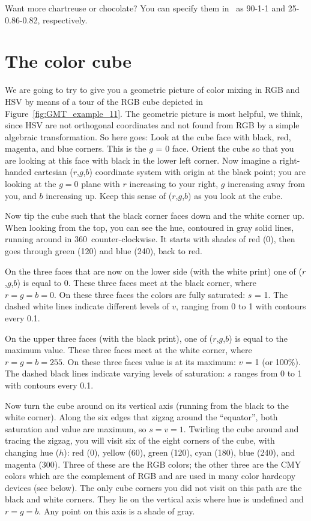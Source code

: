 Want more chartreuse or chocolate? You can specify them in \GMT\ as 90-1-1 and 25-0.86-0.82, respectively.

\section{The color cube}
We are going to try to give you a geometric picture of color
mixing in RGB and HSV by means of a tour of the RGB cube depicted in Figure~\ref{fig:GMT_example_11}.  The geometric
picture is most helpful, we think, since HSV are not orthogonal
coordinates and not found from RGB by a simple algebraic transformation.
So here goes: Look at the
cube face with black, red, magenta, and blue corners.
This is the $g$ = 0 face.  Orient the cube so that you are
looking at this face with black in the lower left corner.  Now
imagine a right-handed cartesian ($r$,$g$,$b$) coordinate system
with origin at the black point; you are looking at the $g = 0$
plane with $r$ increasing to your right, $g$ increasing
away from you, and $b$ increasing up.  Keep this sense of
($r$,$g$,$b$) as you look at the cube.

Now tip the cube such that the black corner faces down and the white corner up. When looking from the top, you can see the hue, contoured in gray solid lines, running around in 360\DS\ counter-clockwise. It starts with shades of red (0\DS), then goes through green (120\DS) and blue (240\DS), back to red.

On the three faces that are now on the lower side (with the white print) one of ($r$,$g$,$b$) is equal to 0. These three faces meet at the black corner, where $r = g = b = 0$. On these three faces the colors are fully saturated: $s$ = 1. The dashed white lines indicate different levels of $v$, ranging from 0 to 1 with contours every 0.1.

On the upper three faces (with the black print), one of ($r$,$g$,$b$) is equal to the
maximum value.  These three faces meet at the white corner, where
$r = g = b = 255$.  On these three faces value is at
its maximum: $v$ = 1 (or 100\%). The dashed black lines indicate varying levels of saturation: $s$ ranges from 0 to
1 with contours every 0.1.

Now turn the cube around on its vertical axis (running from the black to the white corner). Along the six edges that zigzag around the ``equator'', both saturation and value are maximum, so $s = v = 1$. Twirling the cube around and tracing the zigzag, you will visit six of the eight corners of the
cube, with changing hue ($h$):  red (0\DS), yellow (60\DS), green
(120\DS), cyan (180\DS), blue (240\DS), and magenta
(300\DS). Three of these are the RGB colors; the other three
are the CMY colors which are the complement of RGB and are used in many
color hardcopy devices (see below).  The only cube
corners you did not visit on this path are the black and white corners.
They lie on the vertical axis where hue is undefined and $r = g = b$. Any point on this axis is a shade of gray.

